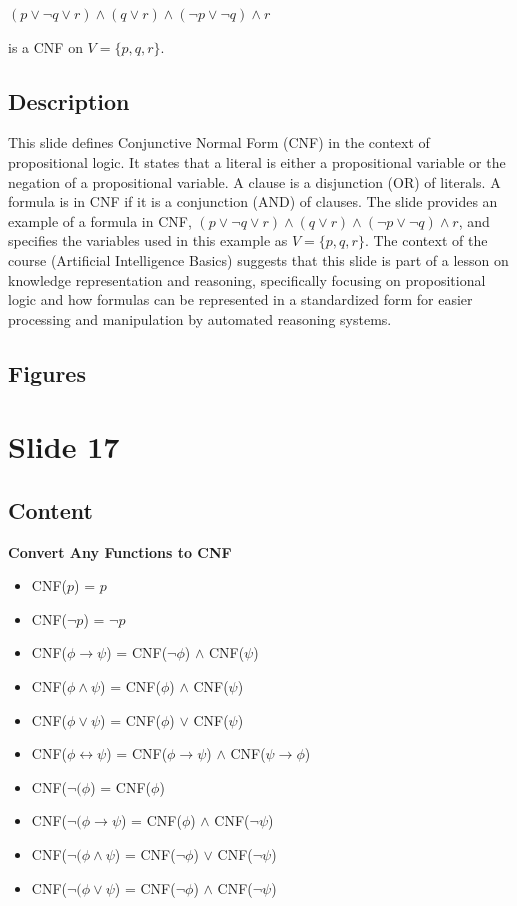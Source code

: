 \documentclass{article}%
\begin{document}
$(p \lor \neg q \lor r) \land (q \lor r) \land (\neg p \lor \neg q) \land r$

is a CNF on $V = \{p, q, r\}$.
%
\subsection{Description}%
This slide defines Conjunctive Normal Form (CNF) in the context of propositional logic.  It states that a literal is either a propositional variable or the negation of a propositional variable.  A clause is a disjunction (OR) of literals.  A formula is in CNF if it is a conjunction (AND) of clauses.  The slide provides an example of a formula in CNF,  $(p \lor \neg q \lor r) \land (q \lor r) \land (\neg p \lor \neg q) \land r$,  and specifies the variables used in this example as $V = \{p, q, r\}$.  The context of the course (Artificial Intelligence Basics) suggests that this slide is part of a lesson on knowledge representation and reasoning, specifically focusing on propositional logic and how formulas can be represented in a standardized form for easier processing and manipulation by automated reasoning systems.%
\subsection{Figures}%
\begin{figure}[H]%
\centering%
\end{figure}

%
\newpage%
\section{Slide 17}%
\label{sec:Slide17}%
\subsection{Content}%

\textbf{Convert Any Functions to CNF}

\begin{itemize}
    \item CNF($p$) = $p$
    \item CNF($\neg p$) = $\neg p$
    \item CNF($\phi \rightarrow \psi$) = CNF($\neg \phi$) $\land$ CNF($\psi$)
    \item CNF($\phi \wedge \psi$) = CNF($\phi$) $\wedge$ CNF($\psi$)
    \item CNF($\phi \vee \psi$) = CNF($\phi$) $\vee$ CNF($\psi$)
    \item CNF($\phi \leftrightarrow \psi$) = CNF($\phi \rightarrow \psi$) $\wedge$ CNF($\psi \rightarrow \phi$)
    \item CNF($\neg (\phi$) = CNF($\phi$)
    \item CNF($\neg (\phi \rightarrow \psi$) = CNF($\phi$) $\wedge$ CNF($\neg \psi$)
    \item CNF($\neg (\phi \wedge \psi$) = CNF($\neg \phi$) $\vee$ CNF($\neg \psi$)
    \item CNF($\neg (\phi \vee \psi$) = CNF($\neg \phi$) $\wedge$ CNF($\neg \psi$)
\end{itemize}
\end{document}

